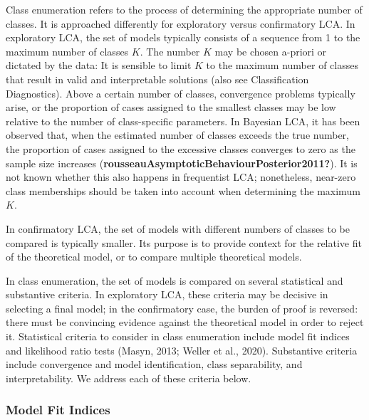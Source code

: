 \documentclass[
  ,man,floatsintext]{apa6}
\begin{document}
Class enumeration refers to the process of determining the appropriate number of classes.
It is approached differently for exploratory versus confirmatory LCA.
In exploratory LCA, the set of models typically consists of a sequence from 1 to the maximum number of classes \(K\).
The number \(K\) may be chosen a-priori or dictated by the data:
It is sensible to limit \(K\) to the maximum number of classes that result in valid and interpretable solutions (also see Classification Diagnostics).
Above a certain number of classes,
convergence problems typically arise,
or the proportion of cases assigned to the smallest classes may be low relative to the number of class-specific parameters.
In Bayesian LCA, it has been observed that, when the estimated number of classes exceeds the true number,
the proportion of cases assigned to the excessive classes converges to zero as the sample size increases (\textbf{rousseauAsymptoticBehaviourPosterior2011?}).
It is not known whether this also happens in frequentist LCA;
nonetheless, near-zero class memberships should be taken into account when determining the maximum \(K\).

In confirmatory LCA,
the set of models with different numbers of classes to be compared is typically smaller.
Its purpose is to provide context for the relative fit of the theoretical model, or to compare multiple theoretical models.

In class enumeration, the set of models is compared on several statistical and substantive criteria.
In exploratory LCA, these criteria may be decisive in selecting a final model;
in the confirmatory case, the burden of proof is reversed: there must be convincing evidence against the theoretical model in order to reject it.
Statistical criteria to consider in class enumeration include model fit indices and
likelihood ratio tests (Masyn, 2013; Weller et al., 2020).
Substantive criteria include convergence and model identification,
class separability,
and interpretability.
We address each of these criteria below.

\hypertarget{model-fit-indices}{%
\subsubsection{Model Fit Indices}\label{model-fit-indices}}
\end{document}
